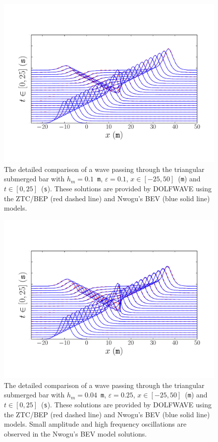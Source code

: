 \begin{figure}[h!]
\bwfig
  \centering
  \centering
  \includegraphics[width=\largefig]{chapters/lopes/pdf/epsilon0_1.pdf}
  \caption{The detailed comparison of a wave passing through the
  triangular submerged bar with $h_m=0.1$~{\tt m}, $\varepsilon=0.1$,
  $x\in[-25,50]$~({\tt m}) and $t\in[0,25]$~({\tt s}).  These solutions
  are provided by DOLFWAVE using the ZTC/BEP (red dashed line) and
  Nwogu's BEV (blue solid line) models.}
  \label{fig:lopes:znspike01}
\vspace*{60pt}
\end{figure}

\begin{figure}[h!]
\bwfig
  \centering
  \includegraphics[width=\largefig]{chapters/lopes/pdf/epsilon0_25.pdf}
  \caption{The detailed comparison of a wave passing through the
    triangular submerged bar with $h_m=0.04$~{\tt m}, $\varepsilon=0.25$,
    $x\in[-25,50]$~({\tt m}) and $t\in[0,25]$~({\tt s}).  These solutions
    are provided by DOLFWAVE using the ZTC/BEP (red dashed line) and
    Nwogu's BEV (blue solid line) models.  Small amplitude and high
    frequency oscillations are observed in the Nwogu's BEV model
    solutions.}
  \label{fig:lopes:znspike025}
\end{figure}\clearpage


